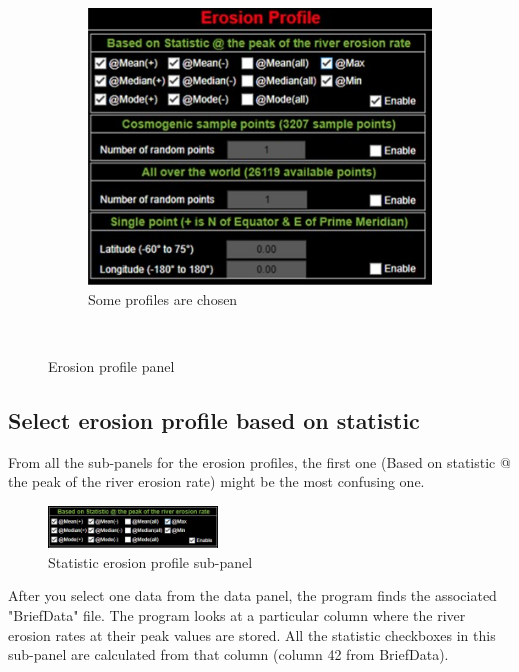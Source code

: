 \documentclass[11pt,a4paper,titlepage]{report}
\begin{document}
\begin{figure}[H]
\begin{subfigure}[H]{0.3\textwidth}
        \includegraphics[width=\textwidth]{ep3.jpg}
        \caption{Some profiles are chosen}
    \end{subfigure}\\
    \caption[Erosion profile panel]{Erosion profile panel}
    \label{fig:erosionprofile}    
\end{figure}

\subsection{Select erosion profile based on statistic}
From all the sub-panels for the erosion profiles, the first one (Based on statistic @ the peak of the river erosion rate) might be the most confusing one.\\

\begin{figure}[H]
    \centering
    \includegraphics[width=0.4\textwidth]{epstat.jpg}
    \caption[Statistic erosion profile sub-panel]{Statistic erosion profile sub-panel}
    \label{fig:epstat}    
\end{figure}

After you select one data from the data panel, the program finds the associated "BriefData" file. The program looks at a particular column where the river erosion rates at their peak values are stored. All the statistic checkboxes in this sub-panel are calculated from that column (column 42 from BriefData).\\
\end{document}
